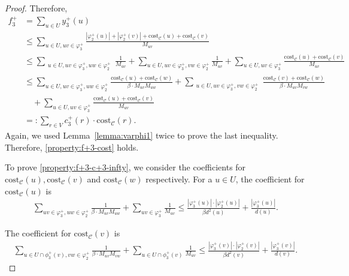 \documentclass[11pt]{article}
\newcommand{\cost}{\mathrm{cost}}
\newcommand{\calC}{{\mathcal{C}}}
\begin{document}
\begin{CJK*}{UTF8}{gbsn}
\begin{proof}
Therefore, 
\begin{align*}
    f^+_3 &= \sum_{u \in U}y^+_3(u) \\
    &\leq \sum_{u \in U, uv \in \varphi^+_3} \frac{|\varphi^+_2(u)| + |\varphi^+_2(v)| +  \cost_{\mathcal{C}}(u)+ \cost_{\mathcal{C}}(v)}{M_{uv}} \\
    &\leq \sum_{\substack{u \in U, uv \in \varphi^+_3, uw \in \varphi^+_2}} \frac{1}{M_{uv}} + \sum_{u \in U, uv \in \varphi^+_3, vw \in \varphi^+_2} \frac{1}{M_{uv}} + \sum_{u \in U, uv \in \varphi^+_3} \frac{\cost_{\mathcal{C}}(u)+ \cost_{\mathcal{C}}(v)}{M_{uv}}\\
    &\leq \sum_{u \in U, uv \in \varphi^+_3, uw \in \varphi^+_2} \frac{\cost_{\mathcal{C}}(u) + \cost_{\mathcal{C}}(w)}{\beta \cdot M_{uv}M_{uw}} + \sum_{\substack{u \in U, uv \in \varphi^+_3, vw \in \varphi^+_2}} \frac{\cost_{\mathcal{C}}(v) + \cost_{\mathcal{C}}(w)}{\beta \cdot M_{uv}M_{vw}} \\
     &\quad + \sum_{u \in U, uv \in \varphi^+_3} \frac{\cost_{\mathcal{C}}(u)+ \cost_{\mathcal{C}}(v)}{M_{uv}}\\
     &=: \sum_{r \in V} c^+_3(r) \cdot \cost_\calC(r). 
\end{align*}
Again, we used Lemma~\ref{lemma:varphi1} twice to prove the last inequality.  Therefore, \ref{property:f+3-cost} holds.



{To prove \ref{property:f+3-c+3-infty}, we consider the coefficients for $\cost_{\mathcal{C}}(u), \cost_{\mathcal{C}}(v)$ and $\cost_{\mathcal{C}}(w)$ respectively. For a $u \in U$, the coefficient for $\cost_{\mathcal{C}}(u)$ is 
\begin{align*}
    \sum_{uv \in \varphi^+_3, uw \in \varphi^+_2}\frac{1}{\beta\cdot M_{uv}M_{uw}} + \sum_{uv\in \varphi^+_3}\frac1{M_{uv}} \leq
    \frac{|\varphi^+_3(u)|\cdot|\varphi^+_2(u)|}{\beta d^2(u)} + \frac{|\varphi^+_3(u)|}{d(u)}.
\end{align*} 

The coefficient for $\cost_{\mathcal{C}}(v)$ is
\begin{align*}
    \sum_{u \in U \cap \phi^+_3(v), vw \in \varphi^+_2}\frac{1}{\beta \cdot M_{uv}M_{vw}} + \sum_{u \in U \cap \phi^+_3(v)}\frac1{M_{uv}} 
\leq \frac{|\varphi^+_3(v)|\cdot|\varphi^+_2(v)|}{\beta d^2(v)} + \frac{|\varphi^+_3(v)|}{d(v)}.
\end{align*}

}
\end{proof}
\end{CJK*}
\end{document}
